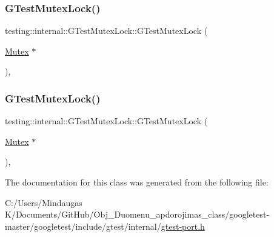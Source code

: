 \mbox{\label{classtesting_1_1internal_1_1_g_test_mutex_lock_a77e3cba326d5356b4a1dea3790559c26}} 
\subsubsection{\texorpdfstring{GTestMutexLock()}{GTestMutexLock()}\hspace{0.1cm}{\footnotesize\ttfamily [2/3]}}
{\footnotesize\ttfamily testing\+::internal\+::\+G\+Test\+Mutex\+Lock\+::\+G\+Test\+Mutex\+Lock (\begin{DoxyParamCaption}\item[{\mbox{\hyperlink{classtesting_1_1internal_1_1_mutex}{Mutex}} $\ast$}]{ }\end{DoxyParamCaption})\hspace{0.3cm}{\ttfamily [inline]}, {\ttfamily [explicit]}}

\mbox{\label{classtesting_1_1internal_1_1_g_test_mutex_lock_a77e3cba326d5356b4a1dea3790559c26}} 
\subsubsection{\texorpdfstring{GTestMutexLock()}{GTestMutexLock()}\hspace{0.1cm}{\footnotesize\ttfamily [3/3]}}
{\footnotesize\ttfamily testing\+::internal\+::\+G\+Test\+Mutex\+Lock\+::\+G\+Test\+Mutex\+Lock (\begin{DoxyParamCaption}\item[{\mbox{\hyperlink{classtesting_1_1internal_1_1_mutex}{Mutex}} $\ast$}]{ }\end{DoxyParamCaption})\hspace{0.3cm}{\ttfamily [inline]}, {\ttfamily [explicit]}}



The documentation for this class was generated from the following file\+:\begin{DoxyCompactItemize}
\item 
C\+:/\+Users/\+Mindaugas K/\+Documents/\+Git\+Hub/\+Obj\+\_\+\+Duomenu\+\_\+apdorojimas\+\_\+class/googletest-\/master/googletest/include/gtest/internal/\mbox{\hyperlink{googletest-master_2googletest_2include_2gtest_2internal_2gtest-port_8h}{gtest-\/port.\+h}}\end{DoxyCompactItemize}
